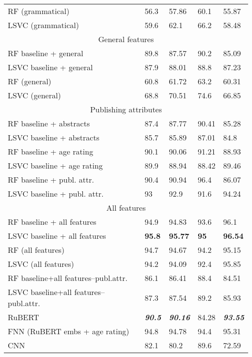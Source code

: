 \documentclass[runningheads]{llncs}
\begin{document}
\begin{table}[htbp]
\begin{tabular}{|l|l|l|l|l|}
RF (grammatical) & 56.3 & 57.86 & 60.1 & 55.87 \\ 
LSVC (grammatical) & 59.6 & 62.1 & 66.2 & 58.48 \\ \hline
\multicolumn{5}{|c|}{General features} \\ \hline
RF baseline + general & 89.8 & 87.57 & 90.2 & 85.09 \\ 
LSVC baseline + general & 87.9 & 88.01 & 88.8 & 87.23 \\ 
RF (general) & 60.8 & 61.72 & 63.2 & 60.31 \\ 
LSVC (general) & 68.8 & 70.51 & 74.6 & 66.85 \\ \hline
\multicolumn{5}{|c|}{Publishing attributes} \\ \hline
RF baseline + abstracts & 87.4 & 87.77 & 90.41 & 85.28 \\ 
LSVC baseline + abstracts & 85.7 & 85.89 & 87.01 & 84.8 \\ 
RF baseline + age rating & 90.1 & 90.06 & 91.21 & 88.93 \\ 
LSVC baseline + age rating & 89.9 & 88.94 & 88.42 & 89.46 \\ 
RF baseline + publ. attr. & 90.4 & 90.94 & 96.4 & 86.07 \\
LSVC baseline + publ. attr. & 93 & 92.9 & 91.6 & 94.24 \\ \hline
\multicolumn{5}{|c|}{All features} \\ \hline
RF baseline + all features & 94.9 & 94.83 & 93.6 & 96.1\\ 
LSVC baseline + all features & \textbf{95.8} & \textbf{95.77} & \textbf{95} & \textbf{96.54} \\ 
RF (all features) & 94.7 & 94.67 & 94.2 & 95.15 \\
LSVC (all features) & 94.2 & 94.09 & 92.4 & 95.85 \\ 
RF baseline+all features–publ.attr. & 86.1 & 86.41 & 88.4 & 84.51 \\
LSVC baseline+all features–publ.attr. & 87.3 & 87.54 & 89.2 & 85.93 \\ \hline
RuBERT & \textit{\textbf{90.5}} & \textit{\textbf{90.16}} & 84.28 & \textit{\textbf{93.55}} \\
FNN (RuBERT embs + age rating) & 94.8 & 94.78 & 94.4 & 95.31 \\ \hline
CNN & 82.1 & 80.2 & 89.6 & 72.59 \\ \hline
\end{tabular}
\end{table}
\end{document}
